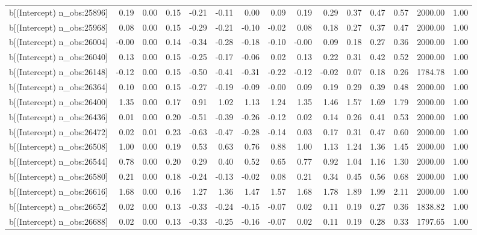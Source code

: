 \begin{table}[ht]
\begin{tabular}{rrrrrrrrrrrrrrr}
  b[(Intercept) n\_obs:25896] & 0.19 & 0.00 & 0.15 & -0.21 & -0.11 & 0.00 & 0.09 & 0.19 & 0.29 & 0.37 & 0.47 & 0.57 & 2000.00 & 1.00 \\ 
  b[(Intercept) n\_obs:25968] & 0.08 & 0.00 & 0.15 & -0.29 & -0.21 & -0.10 & -0.02 & 0.08 & 0.18 & 0.27 & 0.37 & 0.47 & 2000.00 & 1.00 \\ 
  b[(Intercept) n\_obs:26004] & -0.00 & 0.00 & 0.14 & -0.34 & -0.28 & -0.18 & -0.10 & -0.00 & 0.09 & 0.18 & 0.27 & 0.36 & 2000.00 & 1.00 \\ 
  b[(Intercept) n\_obs:26040] & 0.13 & 0.00 & 0.15 & -0.25 & -0.17 & -0.06 & 0.02 & 0.13 & 0.22 & 0.31 & 0.42 & 0.52 & 2000.00 & 1.00 \\ 
  b[(Intercept) n\_obs:26148] & -0.12 & 0.00 & 0.15 & -0.50 & -0.41 & -0.31 & -0.22 & -0.12 & -0.02 & 0.07 & 0.18 & 0.26 & 1784.78 & 1.00 \\ 
  b[(Intercept) n\_obs:26364] & 0.10 & 0.00 & 0.15 & -0.27 & -0.19 & -0.09 & -0.00 & 0.09 & 0.19 & 0.29 & 0.39 & 0.48 & 2000.00 & 1.00 \\ 
  b[(Intercept) n\_obs:26400] & 1.35 & 0.00 & 0.17 & 0.91 & 1.02 & 1.13 & 1.24 & 1.35 & 1.46 & 1.57 & 1.69 & 1.79 & 2000.00 & 1.00 \\ 
  b[(Intercept) n\_obs:26436] & 0.01 & 0.00 & 0.20 & -0.51 & -0.39 & -0.26 & -0.12 & 0.02 & 0.14 & 0.26 & 0.41 & 0.53 & 2000.00 & 1.00 \\ 
  b[(Intercept) n\_obs:26472] & 0.02 & 0.01 & 0.23 & -0.63 & -0.47 & -0.28 & -0.14 & 0.03 & 0.17 & 0.31 & 0.47 & 0.60 & 2000.00 & 1.00 \\ 
  b[(Intercept) n\_obs:26508] & 1.00 & 0.00 & 0.19 & 0.53 & 0.63 & 0.76 & 0.88 & 1.00 & 1.13 & 1.24 & 1.36 & 1.45 & 2000.00 & 1.00 \\ 
  b[(Intercept) n\_obs:26544] & 0.78 & 0.00 & 0.20 & 0.29 & 0.40 & 0.52 & 0.65 & 0.77 & 0.92 & 1.04 & 1.16 & 1.30 & 2000.00 & 1.00 \\ 
  b[(Intercept) n\_obs:26580] & 0.21 & 0.00 & 0.18 & -0.24 & -0.13 & -0.02 & 0.08 & 0.21 & 0.34 & 0.45 & 0.56 & 0.68 & 2000.00 & 1.00 \\ 
  b[(Intercept) n\_obs:26616] & 1.68 & 0.00 & 0.16 & 1.27 & 1.36 & 1.47 & 1.57 & 1.68 & 1.78 & 1.89 & 1.99 & 2.11 & 2000.00 & 1.00 \\ 
  b[(Intercept) n\_obs:26652] & 0.02 & 0.00 & 0.13 & -0.33 & -0.24 & -0.15 & -0.07 & 0.02 & 0.11 & 0.19 & 0.27 & 0.36 & 1838.82 & 1.00 \\ 
  b[(Intercept) n\_obs:26688] & 0.02 & 0.00 & 0.13 & -0.33 & -0.25 & -0.16 & -0.07 & 0.02 & 0.11 & 0.19 & 0.28 & 0.33 & 1797.65 & 1.00 \\ 

\end{tabular}
\end{table}
